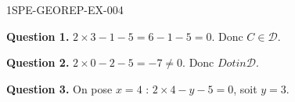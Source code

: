 \begin{corrige}{1SPE-GEOREP-EX-004}


\textbf{Question 1.} $2 \times 3 - 1 - 5 = 6 - 1 - 5 = 0$. Donc $C \in \mathcal{D}$.

\textbf{Question 2.} $2 \times 0 - 2 - 5 = -7
\neq 0$. Donc $D
otin \mathcal{D}$.

\textbf{Question 3.} On pose $x = 4$ : $2 \times 4 - y - 5 = 0$, soit $y = 3$.

\end{corrige}

